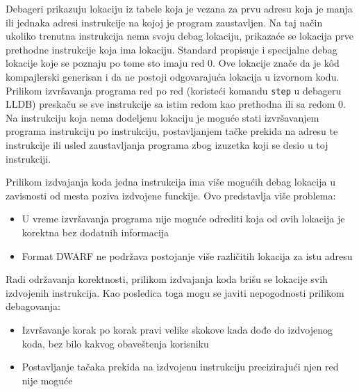 \documentclass[12pt,oneside]{memoir}
\begin{document}
Debageri prikazuju lokaciju iz tabele koja je vezana za prvu adresu koja je manja ili jednaka adresi instrukcije na kojoj je program zaustavljen.
Na taj način ukoliko trenutna instrukcija nema svoju debag lokaciju, prikazaće se lokacija prve prethodne instrukcije koja ima lokaciju.
Standard propisuje i specijalne debag lokacije koje se poznaju po tome sto imaju red 0.
Ove lokacije znače da je k\^od kompajlerski generisan i da ne postoji odgovarajuća lokacija u izvornom kodu.
Prilikom izvršavanja programa red po red (koristeći komandu \verb|step| u debageru LLDB) preskaču se sve instrukcije sa istim redom kao prethodna ili sa redom 0. 
Na instrukciju koja nema dodeljenu lokaciju je moguće stati izvršavanjem programa instrukciju po instrukciju, postavljanjem tačke prekida na adresu te instrukcije ili usled zaustavljanja programa zbog izuzetka koji se desio u toj instrukciji.


Prilikom izdvajanja koda jedna instrukcija ima više mogućih debag lokacija u zavisnosti od mesta poziva izdvojene funckije.
Ovo predstavlja više problema:
\begin{itemize}
  \item U vreme izvršavanja programa nije moguće odrediti koja od ovih lokacija je korektna bez dodatnih informacija
  \item Format DWARF ne podržava postojanje više različitih lokacija za istu adresu \cite{dwarf5}
\end{itemize}
Radi održavanja korektnosti, prilikom izdvajanja koda brišu se lokacije svih izdvojenih instrukcija.
Kao posledica toga mogu se javiti nepogodnosti prilikom debagovanja:
\begin{itemize}
  \item Izvršavanje korak po korak pravi velike skokove kada dođe do izdvojenog koda, bez bilo kakvog obaveštenja korisniku
  \item Postavljanje tačaka prekida na izdvojenu instrukciju precizirajući njen red nije moguće
\end{itemize}
\end{document}
